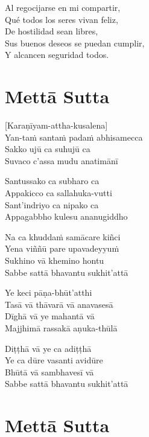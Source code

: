 \begin{english}
	Al regocijarse en mi compartir,\\
	Qué todos los seres vivan feliz,\\
	De hostilidad sean libres,\\
	Sus buenos deseos se puedan cumplir,\\
	Y alcancen seguridad todos.
\end{english}

\chapter[Mettā Sutta]{Mettā Sutta}

\delegateSetUseNext


\begin{leader}
\end{leader}

[Karaṇīyam-attha-kusalena]\\
Yan-taṁ santaṁ padaṁ abhisamecca\\
Sakko ujū ca suhujū ca\\
Suvaco c'assa mudu anatimānī

Santussako ca subharo ca\\
Appakicco ca sallahuka-vutti\\
Sant'indriyo ca nipako ca\\
Appagabbho kulesu ananugiddho

Na ca khuddaṁ samācare kiñci\\
Yena viññū pare upavadeyyuṁ\\
Sukhino vā khemino hontu\\
Sabbe sattā bhavantu sukhit'attā

Ye keci pāṇa-bhūt'atthi\\
Tasā vā thāvarā vā anavasesā\\
Dīghā vā ye mahantā vā\\
Majjhimā rassakā aṇuka-thūlā

Diṭṭhā vā ye ca adiṭṭhā\\
Ye ca dūre vasanti avidūre\\
Bhūtā vā sambhavesī vā\\
Sabbe sattā bhavantu sukhit'attā

\chapter*[Mettā Sutta]{Mettā Sutta}

